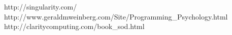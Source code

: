\begin{center}
                      {http://singularity.com/}
                      {http://www.geraldmweinberg.com/Site/Programming_Psychology.html}
                      {http://claritycomputing.com/book_sod.html}

\end{center}
